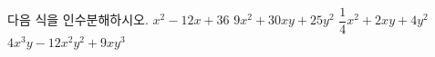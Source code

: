 다음 식을 인수분해하시오.
 $x^2-12x+36$
 $9x^2+30xy+25y^2$
 $\dfrac{1}{4}x^2+2xy+4y^2$
 $4x^3y-12x^2y^2+9xy^3$
